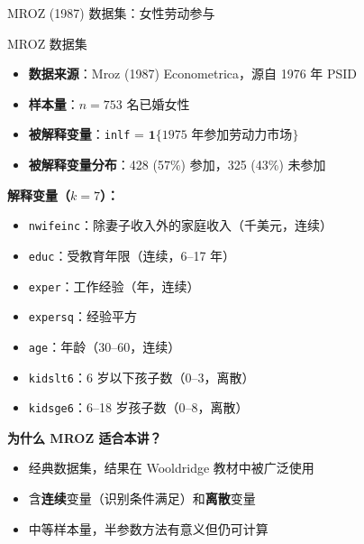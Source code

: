 \documentclass[aspectratio=169, 10pt]{beamer}
\begin{document}
\begin{frame}[shrink=12]{MROZ (1987) 数据集：女性劳动参与}

  \begin{definitionbox}{{MROZ 数据集}}
    \begin{itemize}\setlength{\itemsep}{1pt}
      \item \textbf{数据来源}：Mroz (1987) Econometrica，源自 1976 年 PSID
      \item \textbf{样本量}：$n = 753$ 名已婚女性
      \item \textbf{被解释变量}：\texttt{inlf} = $\mathbf{1}\{\text{1975 年参加劳动力市场}\}$
      \item \textbf{被解释变量分布}：428 (57\%) 参加，325 (43\%) 未参加
    \end{itemize}
  \end{definitionbox}

  \begin{highlightbox}
    \textbf{解释变量（$k = 7$）：}
    \begin{itemize}\setlength{\itemsep}{1pt}
      \item \texttt{nwifeinc}：除妻子收入外的家庭收入（千美元，连续）
      \item \texttt{educ}：受教育年限（连续，6--17 年）
      \item \texttt{exper}：工作经验（年，连续）
      \item \texttt{expersq}：经验平方
      \item \texttt{age}：年龄（30--60，连续）
      \item \texttt{kidslt6}：6 岁以下孩子数（0--3，离散）
      \item \texttt{kidsge6}：6--18 岁孩子数（0--8，离散）
    \end{itemize}
  \end{highlightbox}

  \textbf{为什么 MROZ 适合本讲？}
  \begin{itemize}\setlength{\itemsep}{1pt}
    \item 经典数据集，结果在 Wooldridge 教材中被广泛使用
    \item 含\textbf{连续}变量（识别条件满足）和\textbf{离散}变量
    \item 中等样本量，半参数方法有意义但仍可计算
  \end{itemize}

\end{frame}
\end{document}
